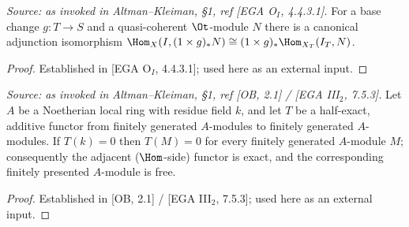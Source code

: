 \begin{theorem}
  \label{thm:ega_adjunction}
  \textit{Source: as invoked in Altman--Kleiman, §1, ref [EGA O$_I$, 4.4.3.1].}
  For a base change $g : T \to S$ and a quasi-coherent $\Ot$-module $N$ there is a
  canonical adjunction isomorphism
  $\Hom_X(I, (1\times g)_* N) \cong (1\times g)_* \Hom_{X_T}(I_T, N)$.
  \begin{proof}
    Established in [EGA O$_I$, 4.4.3.1]; used here as an external input.
  \end{proof}
\end{theorem}

\begin{theorem}
  \label{thm:ob_halfexact_free}
  \textit{Source: as invoked in Altman--Kleiman, §1, ref [OB, 2.1] / [EGA III$_2$, 7.5.3].}
  Let $A$ be a Noetherian local ring with residue field $k$, and let $T$ be a
  half-exact, additive functor from finitely generated $A$-modules to finitely
  generated $A$-modules. If $T(k) = 0$ then $T(M) = 0$ for every finitely
  generated $A$-module $M$; consequently the adjacent ($\Hom$-side) functor is
  exact, and the corresponding finitely presented $A$-module is free.
  \begin{proof}
    Established in [OB, 2.1] / [EGA III$_2$, 7.5.3]; used here as an external input.
  \end{proof}
\end{theorem}

